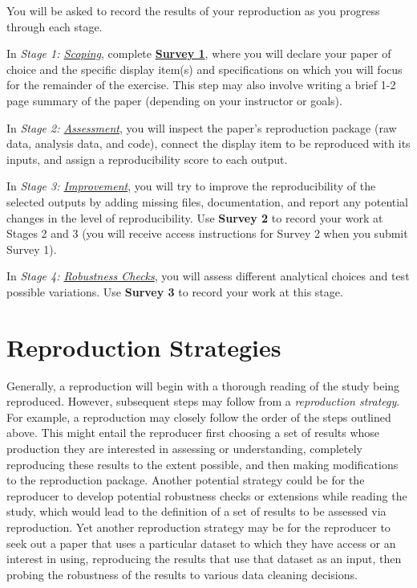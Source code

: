 \documentclass[]{book}
\begin{document}
You will be asked to record the results of your reproduction as you progress through each stage.

In \emph{Stage 1: \protect\hyperlink{scoping}{Scoping}}, complete \textbf{\href{https://berkeley.qualtrics.com/jfe/form/SV_2bO83uJvU9ZiTXv}{Survey 1}}, where you will declare your paper of choice and the specific display item(s) and specifications on which you will focus for the remainder of the exercise. This step may also involve writing a brief 1-2 page summary of the paper (depending on your instructor or goals).

In \emph{Stage 2: \protect\hyperlink{assessment}{Assessment}}, you will inspect the paper's reproduction package (raw data, analysis data, and code), connect the display item to be reproduced with its inputs, and assign a reproducibility score to each output.

In \emph{Stage 3: \protect\hyperlink{improvements}{Improvement}}, you will try to improve the reproducibility of the selected outputs by adding missing files, documentation, and report any potential changes in the level of reproducibility. Use \textbf{Survey 2} to record your work at Stages 2 and 3 (you will receive access instructions for Survey 2 when you submit Survey 1).

In \emph{Stage 4: \protect\hyperlink{robust}{Robustness Checks}}, you will assess different analytical choices and test possible variations. Use \textbf{Survey 3} to record your work at this stage.

\hypertarget{reproduction-strategies}{%
\section*{Reproduction Strategies}\label{reproduction-strategies}}

Generally, a reproduction will begin with a thorough reading of the study being reproduced. However, subsequent steps may follow from a \emph{reproduction strategy}. For example, a reproduction may closely follow the order of the steps outlined above. This might entail the reproducer first choosing a set of results whose production they are interested in assessing or understanding, completely reproducing these results to the extent possible, and then making modifications to the reproduction package. Another potential strategy could be for the reproducer to develop potential robustness checks or extensions while reading the study, which would lead to the definition of a set of results to be assessed via reproduction. Yet another reproduction strategy may be for the reproducer to seek out a paper that uses a particular dataset to which they have access or an interest in using, reproducing the results that use that dataset as an input, then probing the robustness of the results to various data cleaning decisions.
\end{document}
